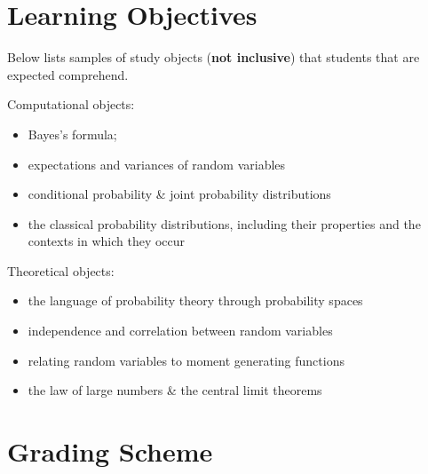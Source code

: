 \documentclass[letterpaper]{inzane_syllabus} %
\begin{document}

\vspace{0.5cm}
\section{Learning Objectives}
Below lists samples of study objects (\textbf{not inclusive}) that students that are expected comprehend.

Computational objects:
\begin{itemize}
\item Bayes's formula;
\item expectations and variances of random variables
\item conditional probability \& joint probability distributions
\item the classical probability distributions, including their properties and the contexts in
which they occur
\end{itemize}
Theoretical objects:
\begin{itemize}
    \item the language of probability theory through probability spaces
    \item independence and correlation between random variables
    \item relating random variables to moment generating functions
    \item the law of large numbers \& the central limit theorems
\end{itemize}
\vspace{0.5cm}
\section{Grading Scheme}

\begin{twentyshort}
\end{twentyshort}
\end{document}
